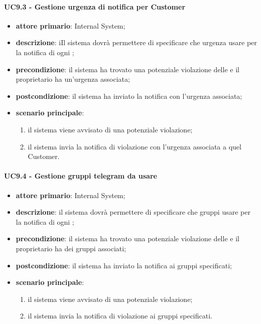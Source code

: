 \paragraph{UC9.3 -  Gestione urgenza di notifica per Customer}
\begin{itemize}
	\item \textbf{attore primario}: Internal System;
	\item \textbf{descrizione}: iIl sistema dovrà permettere di specificare che urgenza usare per la notifica di ogni ; 
	\item \textbf{precondizione}: il sistema ha trovato una potenziale violazione delle  e il  proprietario ha un'urgenza associata;
	\item \textbf{postcondizione}: il sistema ha inviato la notifica con l'urgenza associata;
	\item \textbf{scenario principale}: 
	\begin{enumerate}
		\item il sistema viene avvisato di una potenziale violazione;
		\item il sistema invia la notifica di violazione con l'urgenza associata a quel Customer.
	\end{enumerate}
\end{itemize}
\paragraph{UC9.4 -  Gestione gruppi telegram da usare}
\begin{itemize}
	\item \textbf{attore primario}: Internal System;
	\item \textbf{descrizione}: il sistema dovrà permettere di specificare che gruppi  usare per la notifica di ogni ; 
	\item \textbf{precondizione}: il sistema ha trovato una potenziale violazione delle  e il  proprietario ha dei gruppi  associati;
	\item \textbf{postcondizione}: il sistema ha inviato la notifica ai gruppi specificati;
	\item \textbf{scenario principale}: 
	\begin{enumerate}
		\item il sistema viene avvisato di una potenziale violazione;
		\item il sistema invia la notifica di violazione ai gruppi specificati.
	\end{enumerate}
\end{itemize}
